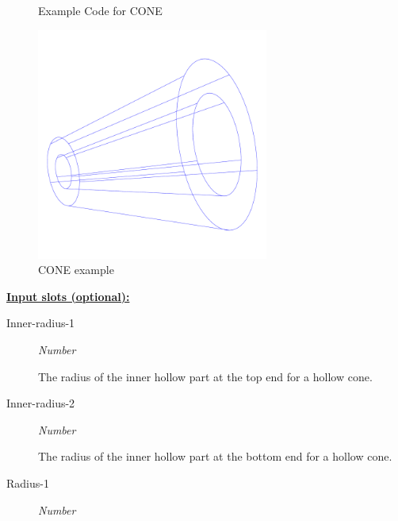 \documentclass [11pt]{book}
\begin{document}
\begin{itemize}
\begin{figure}
\begin{lrbox}{\boxedverb}
\begin{minipage}{\linewidth}
{\begin{verbatim}
\end{verbatim}}
\end{minipage}
\end{lrbox}
\fbox{\usebox{\boxedverb}}

\caption{Example Code for CONE}

\label{fig:example-code-CONE}

\end{figure}

\begin{figure}
\begin{center}
\includegraphics[width=3in,height=3in]{../images/example-cone.pdf}
\end{center}

\caption{CONE example}

\label{fig:CONE}

\end{figure}





\textbf{
\underline{Input slots (optional):}}

\begin{description}

\item [Inner-radius-1]
\emph{Number}

 The radius of the inner hollow part at the top end for a hollow cone.




\item [Inner-radius-2]
\emph{Number}

 The radius of the inner hollow part at the bottom end for a hollow cone.




\item [Radius-1]
\emph{Number}


\end{description}
\end{itemize}
\end{document}
